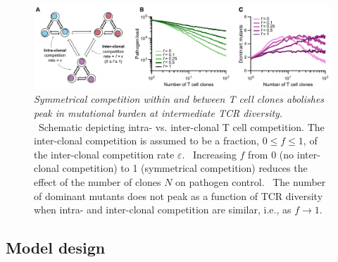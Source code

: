 \begin{figure}[h]
    \centering
    \includegraphics[width=\textwidth]{Figures/VE/figS2_asymComp.pdf}
    \caption[Symmetrical competition within and between T cell clones abolishes peak in mutational burden at intermediate TCR diversity]{\textit{Symmetrical competition within and between T cell clones abolishes peak in mutational burden at intermediate TCR diversity}. %
    ~Schematic depicting intra- vs. inter-clonal T cell competition. The inter-clonal competition is assumed to be a fraction, $0\leq f \leq 1$, of the inter-clonal competition rate $\varepsilon$. %
    ~Increasing $f$ from 0 (no inter-clonal competition) to 1 (symmetrical competition) reduces the effect of the number of clones $N$ on pathogen control.  %
    ~The number of dominant mutants does not peak as a function of TCR diversity when intra- and inter-clonal competition are similar, i.e., as $f\rightarrow1$.}
    \label{fig:VE_supp_asymComp}
\end{figure}


\subsection{Model design}
\label{sec:VE_modelDesign}

